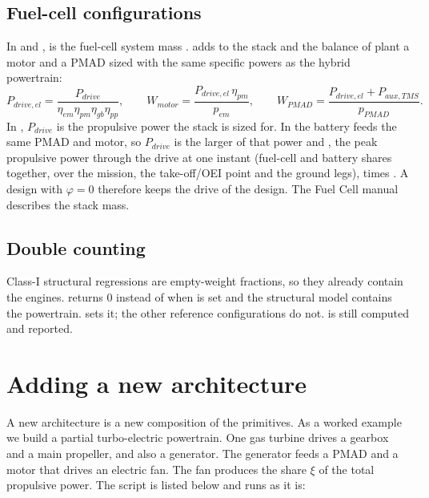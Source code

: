 \documentclass[a4paper,11pt]{article}
\begin{document}
\subsection{Fuel-cell configurations}\label{sec:mass-fc}
In  and ,  is the fuel-cell system
mass .  adds to the stack and the balance
of plant a motor and a PMAD sized with the same specific powers as the hybrid powertrain:
\begin{equation}
  P_{drive,el} = \frac{P_{drive}}{\eta_{em}\eta_{pm}\eta_{gb}\eta_{pp}},\qquad
  W_{motor} = \frac{P_{drive,el}\,\eta_{pm}}{p_{em}},\qquad
  W_{PMAD} = \frac{P_{drive,el} + P_{aux,TMS}}{p_{PMAD}} .
\end{equation}
In , $P_{drive}$ is the propulsive power the stack is sized for. In
 the battery feeds the same PMAD and motor, so $P_{drive}$ is the
larger of that power and , the peak propulsive power through the
drive at one instant (fuel-cell and battery shares together, over the mission, the
take-off/OEI point and the ground legs), times . A design with
$\varphi = 0$ therefore keeps the drive of the  design. The Fuel Cell manual
describes the stack mass.

\subsection{Double counting}
Class-I structural regressions are empty-weight fractions, so they already contain the
engines.  returns 0 instead of  when
 is set and the structural model contains the powertrain.
 sets it; the other reference configurations do not.  is
still computed and reported.

\section{Adding a new architecture}\label{sec:new}

A new architecture is a new composition of the primitives. As a worked example we build a
partial turbo-electric powertrain. One gas turbine drives a gearbox and a main propeller,
and also a generator. The generator feeds a PMAD and a motor that drives an electric fan. The
fan produces the share $\xi$ of the total propulsive power. The script
 is listed below and runs as
it is:
\end{document}
